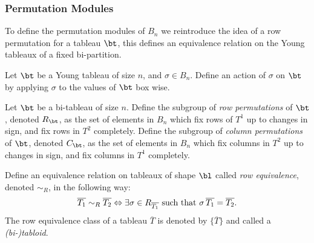 \documentclass[11pt]{report}
\begin{document}
\subsubsection{Permutation Modules}

To define the permutation modules of $B_{n}$ we reintroduce the idea of a row permutation for a tableau $\bt$, this defines an equivalence relation on the Young tableaux of a fixed bi-partition. 


\begin{defn}
	\label{chpt6:def:tabaction}
	Let $\bt$ be a Young tableau of size $n$, and $\sigma \in B_{n}$.  Define an action of $\sigma$ on $\bt$ by applying $\sigma$ to the values of $\bt$ box wise. 
\end{defn}



\begin{defn}
	Let $\bt$ be a bi-tableau of size $n$. Define the subgroup of \emph{row permutations} of $\bt$, denoted $R_{\bt}$, as the set of elements in $B_{n}$ which fix rows of $T^{1}$ up to changes in sign, and fix rows in $T^{2}$ completely. Define the subgroup of \emph{column permutations} of $\bt$, denoted $C_{\bt}$, as the set of elements in $B_{n}$ which fix columns in $T^{2}$ up to changes in sign, and fix columns in $T^{1}$ completely.
\end{defn}

\begin{defn}
	Define an equivalence relation on tableaux of shape $\bl$ called \emph{row equivalence}, denoted $\sim_{R}$, in the following way:
	\[\overline{T_{1}} \sim_{R} \overline{T_{2}} 	\Leftrightarrow \exists\sigma \in R_{\overline{T_{1}}}\textnormal{ such that } \sigma \,  \overline{T_{1}} = \overline{T_{2}}.\]
	The row equivalence class of a tableau $\overline{T}$ is denoted by $\{\overline{T}\}$ and called a  \emph{(bi-)tabloid}.
	
	
\end{defn}
\end{document}
